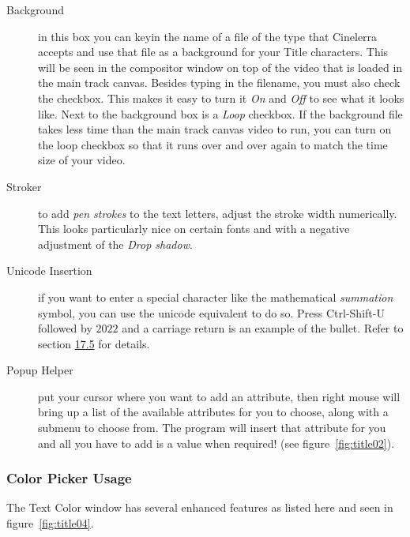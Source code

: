 {\begin{description}
    \item[Background] in this box you can keyin the name of a file of the type that Cinelerra accepts and use that file as a background for your Title characters. This will be seen in the compositor window on top of the video that is loaded in the main track canvas. Besides typing in the filename, you must also check the checkbox. This makes it easy to turn it \textit{On} and \textit{Off} to see what it looks like. Next to the background box is a \textit{Loop} checkbox. If the background file takes less time than the main track canvas video to run, you can turn on the loop checkbox so that it runs over and over again to match the time size of your video.
    \item[Stroker] to add \textit{pen strokes} to the text letters, adjust the stroke width numerically. This looks particularly nice on certain fonts and with a negative adjustment of the \textit{Drop shadow}.
    \item[Unicode Insertion] if you want to enter a special character like the mathematical \textit{summation} symbol, you can use the unicode equivalent to do so. Press Ctrl-Shift-U followed by $2022$ and a carriage return is an example of the bullet. Refer to section \hyperref[sec:textbox_non_std_character_unicode]{17.5} for details.
    \item[Popup Helper] put your cursor where you want to add an attribute, then right mouse will bring up a list of the available attributes for you to choose, along with a submenu to choose from. The program will insert that attribute for you and all you have to add is a value when required! (see figure~\ref{fig:title02}).
\end{description}

\subsubsection*{Color Picker Usage}%
\label{ssub:color_picker_usage}

The Text Color window has several enhanced features as listed here and seen in figure~\ref{fig:title04}.

}
